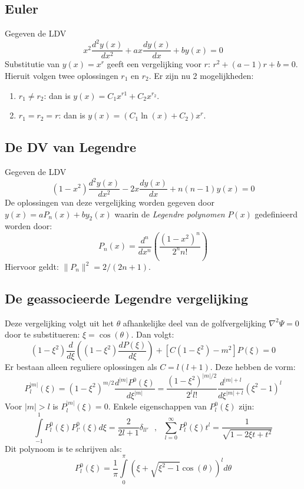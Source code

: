 \subsection{Euler}
Gegeven de LDV
\[
x^2\frac{d^2y(x)}{dx^2}+ax\frac{dy(x)}{dx}+by(x)=0
\]
Substitutie van $y(x)=x^r$ geeft een vergelijking voor $r$: $r^2+(a-1)r+b=0$.
Hieruit volgen twee oplossingen $r_1$ en $r_2$. Er zijn nu 2 mogelijkheden:
\begin{enumerate}
\item $r_1\neq r_2$: dan is $y(x)=C_1x^{r1}+C_2x^{r_2}$.
\item $r_1=r_2=r$: dan is $y(x)=(C_1\ln(x)+C_2)x^r$.
\end{enumerate}

\subsection{De DV van Legendre}
Gegeven de LDV 
\[
(1-x^2)\frac{d^2y(x)}{dx^2}-2x\frac{dy(x)}{dx}+n(n-1)y(x)=0
\]
De oplossingen van deze vergelijking worden gegeven door $y(x)=aP_n(x)+by_2(x)$
waarin de {\it Legendre polynomen} $P(x)$ gedefinieerd worden door:
\[
P_n(x)=\frac{d^n}{dx^n}\left(\frac{(1-x^2)^n}{2^n n!}\right)
\]
Hiervoor geldt: $\|P_n\|^2=2/(2n+1)$.

\subsection{De geassocieerde Legendre vergelijking}
Deze vergelijking volgt uit het $\theta$ afhankelijke deel van de
golfvergelijking $\nabla^2\Psi=0$ door te substitueren: $\xi=\cos(\theta)$.
Dan volgt:
\[
(1-\xi^2)\frac{d}{d\xi}\left((1-\xi^2)\frac{dP(\xi)}{d\xi}\right)+
[C(1-\xi^2)-m^2]P(\xi)=0
\]
Er bestaan alleen reguliere oplossingen als $C=l(l+1)$. Deze hebben de vorm:
\[
P_l^{|m|}(\xi)=(1-\xi^2)^{m/2}\frac{d^{|m|}P^0(\xi)}{d\xi^{|m|}}=
\frac{(1-\xi^2)^{|m|/2}}{2^ll!}\frac{d^{|m|+l}}{d\xi^{|m|+l}}(\xi^2-1)^l
\]
Voor $|m|>l$ is $P_l^{|m|}(\xi)=0$.
Enkele eigenschappen van $P_l^0(\xi)$ zijn:
\[
\int\limits_{-1}^1P_l^0(\xi)P_{l'}^0(\xi)d\xi=\frac{2}{2l+1}\delta_{ll'}~~~,~~~
\sum_{l=0}^\infty P_l^0(\xi)t^l=\frac{1}{\sqrt{1-2\xi t+t^2}}
\]
Dit polynoom is te schrijven als:
\[
P_l^0(\xi)=\frac{1}{\pi}\int\limits_0^\pi(\xi+\sqrt{\xi^2-1}\cos(\theta))^ld\theta
\]

